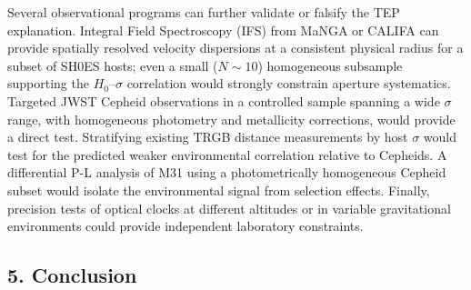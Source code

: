 \documentclass[
]{article}
\begin{document}
Several observational programs can further validate or falsify the TEP
explanation. Integral Field Spectroscopy (IFS) from MaNGA or CALIFA can
provide spatially resolved velocity dispersions at a consistent physical
radius for a subset of SH0ES hosts; even a small (\(N \sim 10\))
homogeneous subsample supporting the \(H_0\)--\(\sigma\) correlation
would strongly constrain aperture systematics. Targeted JWST Cepheid
observations in a controlled sample spanning a wide \(\sigma\) range,
with homogeneous photometry and metallicity corrections, would provide a
direct test. Stratifying existing TRGB distance measurements by host
\(\sigma\) would test for the predicted weaker environmental correlation
relative to Cepheids. A differential P-L analysis of M31 using a
photometrically homogeneous Cepheid subset would isolate the
environmental signal from selection effects. Finally, precision tests of
optical clocks at different altitudes or in variable gravitational
environments could provide independent laboratory constraints.

\subsection{5. Conclusion}\label{conclusion}
\end{document}
